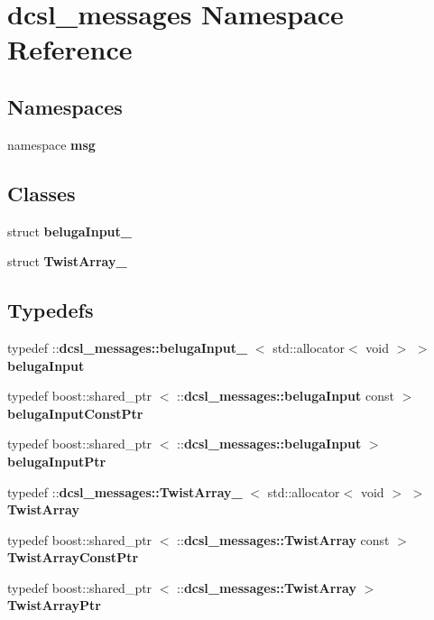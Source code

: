 \section{dcsl\-\_\-messages \-Namespace \-Reference}
\label{namespacedcsl__messages}
\subsection*{\-Namespaces}
\begin{DoxyCompactItemize}
\item 
namespace {\bf msg}
\end{DoxyCompactItemize}
\subsection*{\-Classes}
\begin{DoxyCompactItemize}
\item 
struct {\bf beluga\-Input\-\_\-}
\item 
struct {\bf \-Twist\-Array\-\_\-}
\end{DoxyCompactItemize}
\subsection*{\-Typedefs}
\begin{DoxyCompactItemize}
\item 
typedef \*
\-::{\bf dcsl\-\_\-messages\-::beluga\-Input\-\_\-}\*
$<$ std\-::allocator$<$ void $>$ $>$ {\bf beluga\-Input}
\item 
typedef boost\-::shared\-\_\-ptr\*
$<$ \-::{\bf dcsl\-\_\-messages\-::beluga\-Input} \*
const  $>$ {\bf beluga\-Input\-Const\-Ptr}
\item 
typedef boost\-::shared\-\_\-ptr\*
$<$ \-::{\bf dcsl\-\_\-messages\-::beluga\-Input} $>$ {\bf beluga\-Input\-Ptr}
\item 
typedef \*
\-::{\bf dcsl\-\_\-messages\-::\-Twist\-Array\-\_\-}\*
$<$ std\-::allocator$<$ void $>$ $>$ {\bf \-Twist\-Array}
\item 
typedef boost\-::shared\-\_\-ptr\*
$<$ \-::{\bf dcsl\-\_\-messages\-::\-Twist\-Array} \*
const  $>$ {\bf \-Twist\-Array\-Const\-Ptr}
\item 
typedef boost\-::shared\-\_\-ptr\*
$<$ \-::{\bf dcsl\-\_\-messages\-::\-Twist\-Array} $>$ {\bf \-Twist\-Array\-Ptr}
\end{DoxyCompactItemize}
